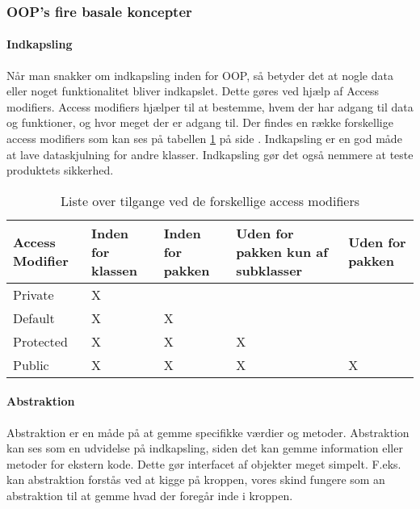 \subsubsection{OOP's fire basale koncepter }

    \paragraph{Indkapsling} 
    Når man snakker om indkapsling inden for OOP, så betyder det at nogle data eller noget funktionalitet bliver indkapslet. Dette gøres ved hjælp af Access modifiers. Access modifiers hjælper til at bestemme, hvem der har adgang til data og funktioner, og hvor meget der er adgang til. Der findes en række forskellige access modifiers som kan ses på tabellen \ref{tab:Access modifier} på side \pageref{tab:Access modifier}. Indkapsling er en god måde at lave dataskjulning for andre klasser. Indkapsling gør det også nemmere at teste produktets sikkerhed. 
        
        \begin{table}[H]
        \centering
            \begin{tabular}{p{2cm}|p{2cm}|p{2cm}|p{3cm}|p{2cm}}
                \textbf{Access Modifier} & \textbf{Inden for klassen} &
                \textbf{Inden for pakken} & \textbf{Uden for pakken kun af
                subklasser} & \textbf{  Uden for pakken} \\
                \hline
                Private   & X &   &   &   \\
                \hline
                Default   & X & X &   &   \\
                \hline
                Protected & X & X & X &   \\
                \hline
                Public    & X & X & X & X \\
            \end{tabular}%
            \caption{Liste over tilgange ved de forskellige access modifiers}
            \label{tab:Access modifier}
        \end{table}

    \paragraph{Abstraktion} 
    Abstraktion er en måde på at gemme specifikke værdier og metoder. Abstraktion kan ses som en udvidelse på indkapsling, siden det kan gemme information eller metoder for ekstern kode. Dette gør interfacet af objekter meget simpelt. F.eks. kan abstraktion forstås ved at kigge på kroppen, vores skind fungere som an abstraktion til at gemme hvad der foregår inde i kroppen.

